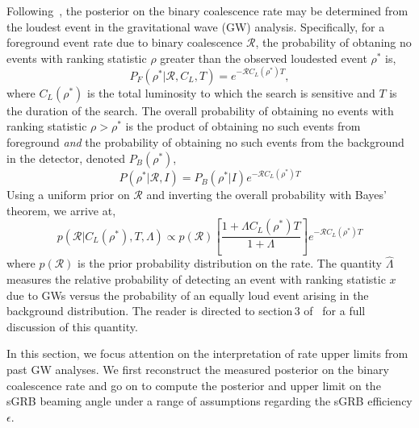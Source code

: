 \documentclass[twocolumn,nofootinbib]{revtex4-1}
\newcommand{\cbcrate}{{{\mathcal R}}}
\newcommand{\rhostar}{{\rho^*}}
\def\gw#1{gravitational wave#1 (GW#1)\gdef\gw{GW}}
\begin{document}
Following~\cite{Biswas09,BradyFairhurst08}, the posterior on the binary
coalescence rate may be determined from the loudest event in the \gw{}
analysis.  Specifically, for a foreground event rate due to  binary coalescence
$\cbcrate$, the probability of obtaning no events with ranking statistic $\rho$
greater than the observed loudested event $\rhostar$ is,
%
\begin{equation}
P_F(\rhostar | \cbcrate, C_L, T) = e^{-\cbcrate C_L(\rhostar) T},
\end{equation}
%
where $C_L(\rhostar)$ is the total luminosity to which the search is sensitive
and $T$ is the duration of the search.  The overall probability of obtaining
no events with ranking statistic $\rho>\rhostar$ is the product of obtaining
no such events from foreground \emph{and} the probability of obtaining no such
events from the background in the detector, denoted $P_B(\rhostar)$,
%
\begin{equation}
P(\rhostar|\cbcrate,I) = P_B(\rhostar|I)e^{-\cbcrate C_L(\rhostar) T}
\end{equation}
%
Using a uniform prior on $\cbcrate$ and inverting the overall probability with
Bayes' theorem, we arrive at,
%
\begin{equation}\label{eq:loudestEventPosterior}
p(\cbcrate | C_L({\rhostar}), T, \Lambda) \propto p(\cbcrate) \left[ \frac{1+\Lambda
C_L(\rhostar) T}{1+\Lambda}\right] e^{-\cbcrate C_L(\rhostar) T}
\end{equation}
%
where $p(\cbcrate)$ is the prior probability distribution on the rate.  The
quantity $\hat{\Lambda}$ measures the relative probability of detecting an event
with ranking statistic $x$ due to \gw{s} versus the probability of an equally loud
event arising in the background distribution.  The reader is directed to
section\,3 of~\cite{BradyFairhurst08} for a full discussion of this quantity.


In this section, we focus attention on the interpretation of rate upper limits
from past \gw{} analyses.  We first reconstruct the measured posterior on the
binary coalescence rate and go on to compute the posterior and upper limit on
the sGRB beaming angle under a range of assumptions regarding the sGRB
efficiency $\epsilon$.
\end{document}
